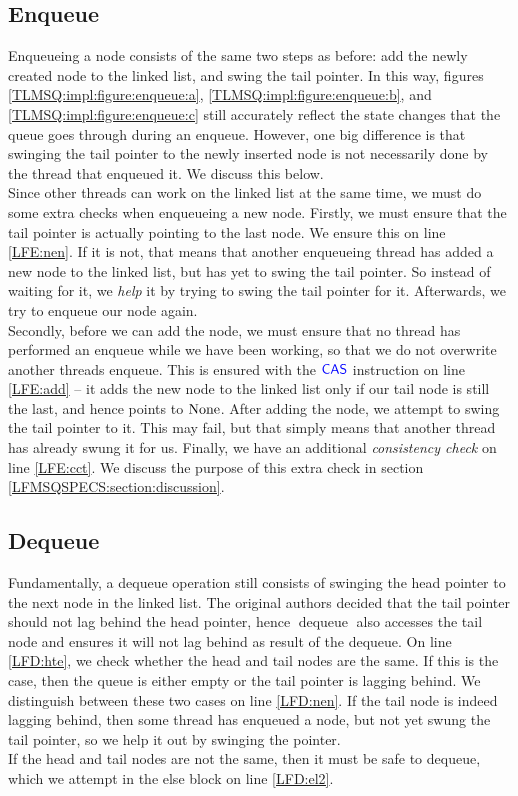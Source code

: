 \documentclass[a4paper, 10pt]{report}
\theoremstyle{definition}
\newcommand{\dequeue}{\operatorname{dequeue}}
\begin{document}
\subsection{Enqueue}
Enqueueing a node consists of the same two steps as before: add the newly created node to the linked list, and swing the tail pointer. In this way, figures \ref{TLMSQ:impl:figure:enqueue:a}, \ref{TLMSQ:impl:figure:enqueue:b}, and \ref{TLMSQ:impl:figure:enqueue:c} still accurately reflect the state changes that the queue goes through during an enqueue. However, one big difference is that swinging the tail pointer to the newly inserted node is not necessarily done by the thread that enqueued it. We discuss this below.\\
Since other threads can work on the linked list at the same time, we must do some extra checks when enqueueing a new node. Firstly, we must ensure that the tail pointer is actually pointing to the last node. We ensure this on line \ref{LFE:nen}. If it is not, that means that another enqueueing thread has added a new node to the linked list, but has yet to swing the tail pointer. So instead of waiting for it, we \textit{help} it by trying to swing the tail pointer for it. Afterwards, we try to enqueue our node again.\\
Secondly, before we can add the node, we must ensure that no thread has performed an enqueue while we have been working, so that we do not overwrite another threads enqueue. This is ensured with the $\textsf{\color{blue} CAS}$ instruction on line \ref{LFE:add} -- it adds the new node to the linked list only if our tail node is still the last, and hence points to $\operatorname{None}$. After adding the node, we attempt to swing the tail pointer to it. This may fail, but that simply means that another thread has already swung it for us.
Finally, we have an additional \textit{consistency check} on line \ref{LFE:cct}. We discuss the purpose of this extra check in section \ref{LFMSQSPECS:section:discussion}.

\subsection{Dequeue}
Fundamentally, a dequeue operation still consists of swinging the head pointer to the next node in the linked list. The original authors decided that the tail pointer should not lag behind the head pointer, hence $\dequeue$ also accesses the tail node and ensures it will not lag behind as result of the dequeue. On line \ref{LFD:hte}, we check whether the head and tail nodes are the same. If this is the case, then the queue is either empty or the tail pointer is lagging behind. We distinguish between these two cases on line \ref{LFD:nen}. If the tail node is indeed lagging behind, then some thread has enqueued a node, but not yet swung the tail pointer, so we help it out by swinging the pointer.\\
If the head and tail nodes are not the same, then it must be safe to dequeue, which we attempt in the else block on line \ref{LFD:el2}.
\end{document}
